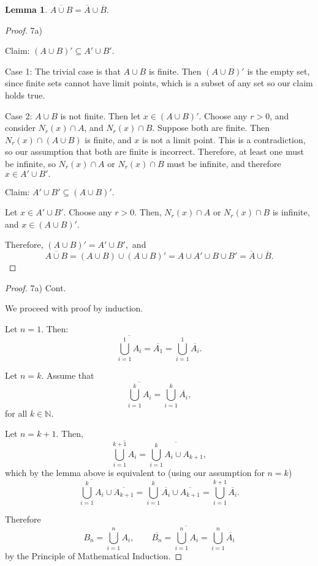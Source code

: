\documentclass[10pt]{article}
\theoremstyle{definition}
\theoremstyle{plain}
\newtheorem*{lemma*}{Lemma}
\newcommand{\N}{\mathbb{N}}
\begin{document}
\begin{lemma*}
$\overline{A\cup B} = \overline{A}\cup\overline{B}.$
\end{lemma*}

\begin{proof}
7a)

Claim: $(A\cup B)' \subseteq A' \cup B'.$

Case 1: The trivial case is that $A\cup B$ is finite. Then $(A\cup B)'$ is the empty set, since finite sets cannot have limit points, which is a subset of any set so our claim holds true.

Case 2: $A\cup B$ is not finite. Then let $x\in(A\cup B)'$. Choose any $r>0$, and consider $N_r (x) \cap A$, and $N_r (x) \cap B$. Suppose both are finite. Then $N_r (x) \cap (A\cup B)$ is finite, and $x$ is not a limit point. This is a contradiction, so our assumption that both are finite is incorrect. Therefore, at least one must be infinite, so $N_r (x) \cap A$ or $N_r (x) \cap B$ must be infinite, and therefore $x\in A'\cup B'.$

Claim: $A' \cup B' \subseteq (A\cup B)'.$

Let $x\in A'\cup B'.$ Choose any $r>0$. Then, $N_r (x) \cap A$ or $N_r (x) \cap B$  is infinite, and $x\in(A\cup B)'$.

Therefore, $(A\cup B)' = A' \cup B',$ and 
$$\overline{A\cup B} = (A\cup B)\cup(A\cup B)' = A\cup A' \cup B \cup B' = \overline{A}\cup\overline{B}.$$
\end{proof}

\begin{proof}
7a) Cont.

We proceed with proof by induction.

Let $n = 1.$ Then:
$$\overline{\bigcup^1_{i=1} A_i} = \overline{A_1}=\bigcup^1_{i=1} \overline{A_i}.$$

Let $n=k$. Assume that 
$$\overline{\bigcup^k_{i=1} A_i} = \bigcup^k_{i=1} \overline{A_i},$$ for all $k\in\N$.

Let $n=k+1$. Then, 
$$\overline{\bigcup^{k+1}_{i=1} A_i} = \overline{\bigcup^k_{i=1} A_i \cup A_{k+1}},$$
which by the lemma above is equivalent to (using our assumption for $n=k$)
$$\overline{\bigcup^k_{i=1} A_i} \cup \overline{A_{k+1}} = \bigcup^k_{i=1} \overline{A_i} \cup \overline{A_{k+1}} = \bigcup^{k+1}_{i=1} \overline{A_i}.$$

Therefore 
$$B_n = \bigcup^n_{i=1} A_i, \qquad \overline{B_n} = \overline{\bigcup^n_{i=1} A_i} = \bigcup^n_{i=1} \overline{A_i}$$
by the Principle of Mathematical Induction. 
\end{proof}
\end{document}
